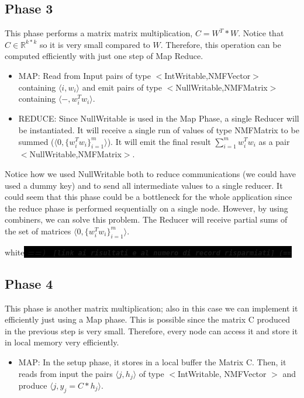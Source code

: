 \documentclass[a4paper,12pt]{article}
\newcommand{\commento}[1]{\begin{color}{white}\colorbox{black}{
	\textit{\textbf{==) \texttt{ [#1] (==}}}}\end{color}
}
\begin{document}
\subsection{Phase 3}
\label{sec:phase3}

This phase performs a matrix matrix multiplication, $C=W^T*W$.
Notice that $C \in \mathbb{R}^{k*k}$ so it is very small compared to $W$.
Therefore, this operation can be computed efficiently with just one step of Map Reduce.

       \begin{itemize}

         \item MAP: Read from Input pairs of type $<$IntWritable,NMFVector$>$ containing $\langle i, w_i \rangle$ and emit pairs of type $<$NullWritable,NMFMatrix$>$ containing  $\langle -,w_i^T w_i \rangle$.

          \item REDUCE: Since NullWritable is used in the Map Phase, a single Reducer will be instantiated. It will receive a single run of values of type NMFMatrix to be summed ($\langle 0,\{w_i^T w_i\}_{i=1}^{m} \rangle $). It will emit the final result $\sum_{i=1}^{m} w_i^T w_i$ as a pair $<$NullWritable,NMFMatrix$>$.

       \end{itemize}
Notice how we used NullWritable both to reduce communications (we could have used a dummy key) and to send all intermediate values to a single reducer.
It could seem that this phase could be a bottleneck for the whole application since the reduce phase is performed sequentially on a single node.
However, by using combiners, we can solve this problem.
The Reducer will receive partial sums of the set of matrices $\langle 0,\{w_i^T w_i\}_{i=1}^{m} \rangle $.
\commento{link ai risultati e al numero di record risparmiati}

\subsection{Phase 4}
\label{sec:phase4}

This phase is another matrix multiplication; also in this case we can implement it efficiently just using a Map phase.
This is possible since the matrix C produced in the previous step is very small.
Therefore, every node can access it and store it in local memory very efficiently.

\begin{itemize}

         \item MAP: In the setup phase, it stores in a local buffer the Matrix C.
         			Then, it reads from input the pairs $ \langle j, h_j \rangle$ of type $<$IntWritable, NMFVector $>$ and produce $ \langle j, y_j = C*h_j \rangle$.

\end{itemize}
\end{document}
